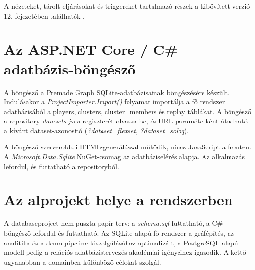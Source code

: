 A nézeteket, tárolt eljárásokat és triggereket tartalmazó részek a kibővített verzió 12. fejezetében találhatók \cite{premadegraph-full}.

\section{Az ASP.NET Core / C\# adatbázis-böngésző}

A böngésző a Premade Graph SQLite-adatbázisainak böngészésére készült. Indulásakor a \textit{ProjectImporter.Import()} folyamat importálja a fő rendszer adatbázisából a players, clusters, cluster\_members és replay táblákat. A böngésző a repository \textit{datasets.json} regiszterét olvassa be, és URL-paraméterként átadható a kívánt dataset-azonosító (\textit{?dataset=flexset}, \textit{?dataset=soloq}).

A böngésző szerveroldali HTML-generálással működik; nincs JavaScript a fronten. A \textit{Microsoft.Data.Sqlite} NuGet-csomag az adatbáziselérés alapja. Az alkalmazás lefordul, és futtatható a repositoryból.

\section{Az alprojekt helye a rendszerben}

A databaseproject nem puszta papír-terv: a \textit{schema.sql} futtatható, a C\# böngésző lefordul és futtatható. Az SQLite-alapú fő rendszer a gráfépítés, az analitika és a demo-pipeline kiszolgálásához optimalizált, a PostgreSQL-alapú modell pedig a relációs adatbázistervezés akadémiai igényeihez igazodik. A kettő ugyanabban a domainben különböző célokat szolgál.
